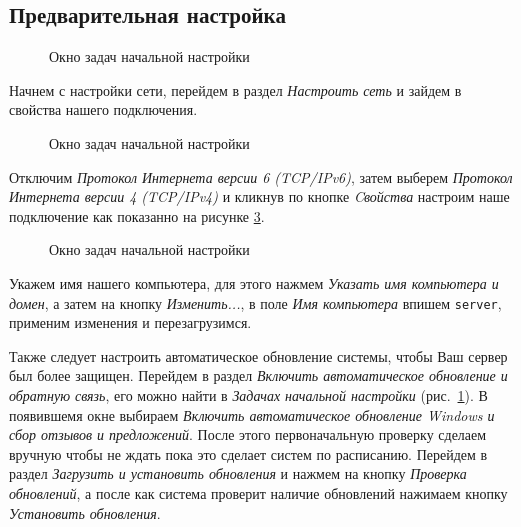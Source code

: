 \subsection{Предварительная настройка}
\begin{figure}[H]
\caption{Окно задач начальной настройки}
\label{igas12}
\end{figure}
Начнем с настройки сети, перейдем в раздел \textit{Настроить сеть} и зайдем в свойства нашего подключения.
\begin{figure}[H]
\caption{Окно задач начальной настройки}
\label{igas13}
\end{figure}
Отключим \textit{Протокол Интернета версии 6 (TCP/IPv6)}, затем выберем \textit{Протокол Интернета версии 4 (TCP/IPv4)} и кликнув по кнопке \textit{Cвойства} настроим наше подключение как показанно на рисунке \ref{igas14}.
\begin{figure}[H]
\caption{Окно задач начальной настройки}
\label{igas14}
\end{figure}
Укажем имя нашего компьютера, для этого нажмем \emph{Указать имя компьютера и домен}, а затем на кнопку \emph{Изменить...}, в поле \emph{Имя компьютера} впишем \texttt{server}, применим изменения и перезагрузимся.
\par
Также следует настроить автоматическое обновление системы, чтобы Ваш сервер был более защищен. Перейдем в раздел \textit{Включить автоматическое обновление и обратную связь}, его можно найти в \textit{Задачах начальной настройки} (рис.~\ref{igas12}). В появившемя окне выбираем \textit{Включить автоматическое обновление Windows и сбор отзывов и предложений}. После этого первоначальную проверку сделаем вручную чтобы не ждать пока это сделает систем по расписанию. Перейдем в раздел \textit{Загрузить и установить обновления} и нажмем на кнопку \textit{Проверка обновлений}, а после как система проверит наличие обновлений нажимаем кнопку \textit{Установить обновления}.
\newpage
